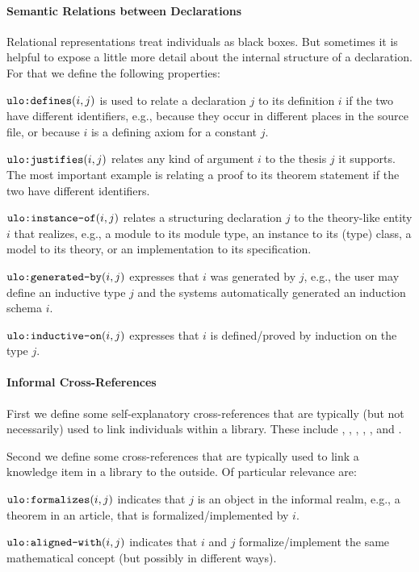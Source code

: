\paragraph{Semantic Relations between Declarations}
Relational representations treat individuals as black boxes.
But sometimes it is helpful to expose a little more detail about the internal structure of a declaration.
For that we define the following properties:
\begin{compactitem}
 \item $\ind{defines}(i,j)$ is used to relate a declaration $j$ to its definition $i$ if the two have different identifiers, e.g., because they occur in different places in the source file, or because $i$ is a defining axiom for a constant $j$.
 \item $\ind{justifies}(i,j)${\isabelle} relates any kind of argument $i$ to the thesis $j$ it supports. The most important example is relating a proof to its theorem statement if the two have different identifiers.
 \item $\ind{instance-of}(i,j)${\isabelle\coq} relates a structuring declaration $j$ to the theory-like entity $i$ that realizes, e.g., a module to its module type, an instance to its (type) class, a model to its theory, or an implementation to its specification.
 \item $\ind{generated-by}(i,j)$ expresses that $i$ was generated by $j$, e.g., the user may define an inductive type $j$ and the systems automatically generated an induction schema $i$.
 \item $\ind{inductive-on}(i,j)${\isabelle} expresses that $i$ is defined/proved by induction on the type $j$.
\end{compactitem}

\paragraph{Informal Cross-References}
First we define some self-explanatory cross-references that are typically (but not necessarily) used to link individuals within a library. These include , , , , , and .

Second we define some cross-references that are typically used to link a knowledge item in a library to the outside.
Of particular relevance are:
\begin{compactitem}
 \item $\ind{formalizes}(i,j)$ indicates that $j$ is an object in the informal realm, e.g., a theorem in an article, that is formalized/implemented by $i$.
 \item $\ind{aligned-with}(i,j)$ indicates that $i$ and $j$ formalize/implement the same mathematical concept (but possibly in different ways).
\end{compactitem}

